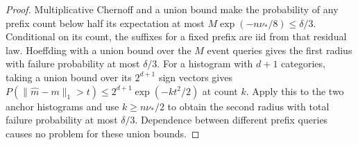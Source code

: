 \begin{proof}
Multiplicative Chernoff and a union bound make the probability of any
prefix count below half its expectation at most
$M\exp(-n\nu_*/8)\le\delta/3$.
Conditional on its count, the suffixes for a fixed prefix are iid from
that residual law. Hoeffding with a union bound over the $M$ event
queries gives the first radius with failure probability at most
$\delta/3$. For a histogram with $d+1$ categories, taking a union bound
over its $2^{d+1}$ sign vectors gives
$P(\|\widehat m-m\|_1>t)\le2^{d+1}\exp(-kt^2/2)$ at count $k$.
Apply this to the two anchor histograms and use $k\ge n\nu_*/2$ to
obtain the second radius with total failure probability at most
$\delta/3$. Dependence between different prefix queries causes no
problem for these union bounds.
\end{proof}
